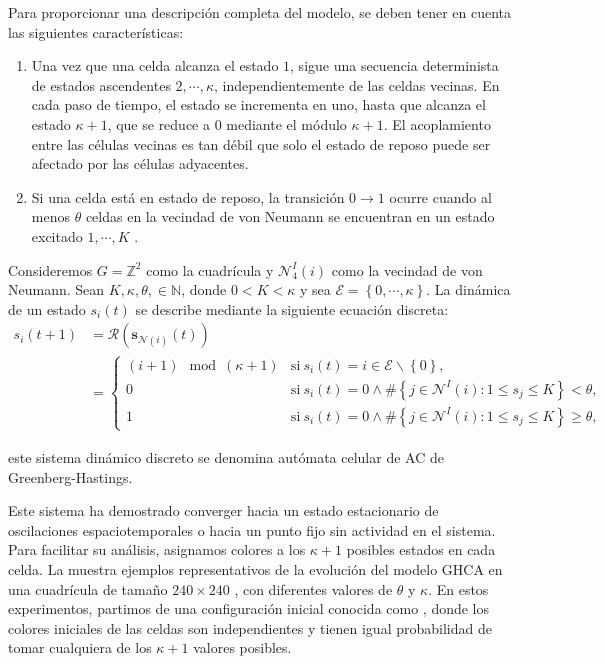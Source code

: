 Para proporcionar una descripción completa del modelo, se deben tener en cuenta las siguientes características:

\begin{enumerate}
	\item  Una vez que una celda alcanza el estado $1$, sigue una secuencia determinista de estados ascendentes  $2,\cdots,\kappa$, independientemente de las celdas vecinas. En cada paso de tiempo, el estado se incrementa en uno, hasta que alcanza el estado $\kappa + 1$, que se reduce a $0$ mediante el módulo $\kappa + 1$. El acoplamiento entre las células vecinas es tan débil que solo el estado de reposo puede ser afectado por las células adyacentes.
	\item Si una celda está en estado de reposo, la transición $0\to1$  ocurre cuando al menos $\theta$ celdas en la vecindad de von Neumann se encuentran en un estado excitado $1,\cdots,K$ . 
\end{enumerate}

\begin{definitionT}
	Consideremos $G=\mathbb{Z}^2$ como la cuadrícula y $\mathcal{N}_4^I(i)$  como la vecindad de von Neumann. Sean $K,\kappa,\theta, \in \mathbb{N}$, donde $0<K<\kappa$ y  sea $\mathcal{E}=\left\{0,\cdots,\kappa\right\}$.   La dinámica de un estado $s_i(t)$ se describe mediante la siguiente ecuación discreta:
	\begin{align}\label{eq:53}
	s_i(t+1)&= \mathcal{R}(\mathbf{s}_{\mathcal{N}(i)}(t)) \\	
		&=\begin{cases}
			(i+1) \mod (\kappa+1) & \text{si} \ s_i(t)=i\in\mathcal{E}\backslash \left\{0\right\},\\
			0 & \text{si} \ s_i(t)=0 \land \# \left\{ j \in \mathcal{N}^I(i):  1 \leq s_j \leq K\right\}<\theta,\\
			1 & \text{si} \ s_i(t)=0 \land \# \left\{ j \in \mathcal{N}^I(i):  1 \leq s_j \leq K\right\}\geq\theta,
		\end{cases}
	\end{align}
	
	este sistema dinámico discreto se denomina autómata celular de AC de Greenberg-Hastings. 
\end{definitionT}

Este sistema  ha demostrado converger hacia un estado estacionario de oscilaciones espaciotemporales o hacia un punto fijo sin actividad en el sistema.   Para facilitar su análisis, asignamos colores a los $\kappa + 1$ posibles estados en cada celda. La  muestra ejemplos representativos de la evolución del modelo GHCA en una cuadrícula de tamaño $240\times240$ , con diferentes valores de $\theta$ y $\kappa$. En estos experimentos, partimos de una configuración inicial conocida como , donde los colores iniciales de las celdas son independientes y tienen igual probabilidad de tomar cualquiera de los $\kappa + 1$ valores posibles.


